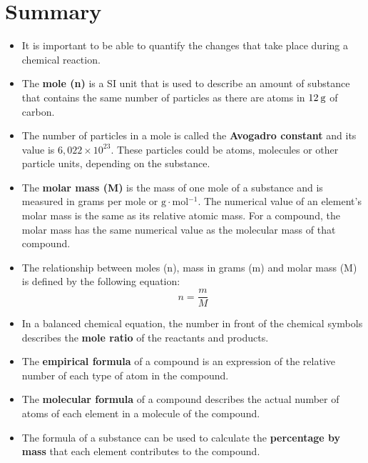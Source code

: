             \section{Summary}
            \nopagebreak
      \label{m38712*id285735}\begin{itemize}[noitemsep]
            \label{m38712*uid107}\item It is important to be able to quantify the changes that take place during a chemical reaction.
\label{m38712*uid108}\item The \textbf{mole (n)} is a SI unit that is used to describe an amount of substance that contains the same number of particles as there are atoms in $12\phantom{\rule{2pt}{0ex}}\mathrm{g}$ of carbon.
\label{m38712*uid109}\item The number of particles in a mole is called the \textbf{Avogadro constant} and its value is $6,022\ensuremath{\times}{10}^{23}$. These particles could be atoms, molecules or other particle units, depending on the substance.
\label{m38712*uid110}\item The \textbf{molar mass (M)} is the mass of one mole of a substance and is measured in grams per mole or $\mathrm{g}\ensuremath{\cdot}\mathrm{mol}{}^{-1}$. The numerical value of an element's molar mass is the same as its relative atomic mass. For a compound, the molar mass has the same numerical value as the molecular mass of that compound.
\label{m38712*uid111}\item The relationship between moles (n), mass in grams (m) and molar mass (M) is defined by the following equation:
\label{m38712*id285862}\nopagebreak\noindent{}
    \begin{equation}
    n=\frac{m}{M}\tag{18.53}
      \end{equation}
    \label{m38712*uid112}\item In a balanced chemical equation, the number in front of the chemical symbols describes the \textbf{mole ratio} of the reactants and products.
\label{m38712*uid113}\item The \textbf{empirical formula} of a compound is an expression of the relative number of each type of atom in the compound.
\label{m38712*uid114}\item The \textbf{molecular formula} of a compound describes the actual number of atoms of each element in a molecule of the compound.
\label{m38712*uid115}\item The formula of a substance can be used to calculate the \textbf{percentage by mass} that each element contributes to the compound.

\end{itemize}
